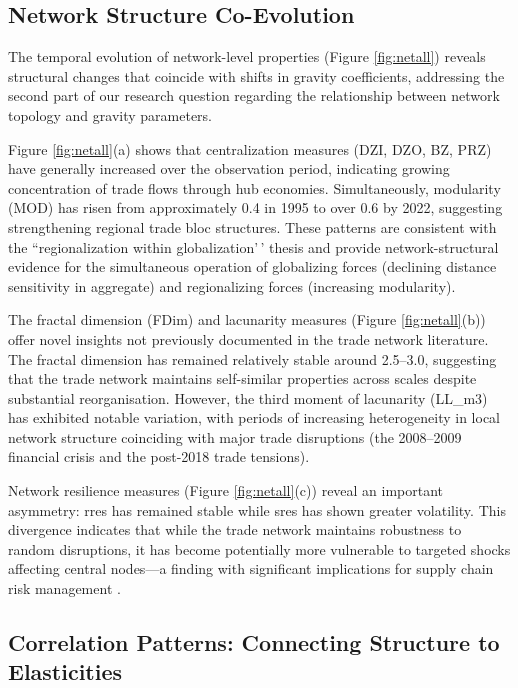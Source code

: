 \documentclass[preprint, 3p,
authoryear]{elsarticle} %
\begin{document}
\subsection{Network Structure
Co-Evolution}\label{subsec:network_coevolution}

The temporal evolution of network-level properties (Figure
\ref{fig:netall}) reveals structural changes that coincide with shifts
in gravity coefficients, addressing the second part of our research
question regarding the relationship between network topology and gravity
parameters.

Figure \ref{fig:netall}(a) shows that centralization measures (DZI, DZO,
BZ, PRZ) have generally increased over the observation period,
indicating growing concentration of trade flows through hub economies.
Simultaneously, modularity (MOD) has risen from approximately 0.4 in
1995 to over 0.6 by 2022, suggesting strengthening regional trade bloc
structures. These patterns are consistent with the ``regionalization
within globalization'\,' thesis \citep{baldwin2006} and provide
network-structural evidence for the simultaneous operation of
globalizing forces (declining distance sensitivity in aggregate) and
regionalizing forces (increasing modularity).

The fractal dimension (FDim) and lacunarity measures (Figure
\ref{fig:netall}(b)) offer novel insights not previously documented in
the trade network literature. The fractal dimension has remained
relatively stable around 2.5--3.0, suggesting that the trade network
maintains self-similar properties across scales despite substantial
reorganisation. However, the third moment of lacunarity (LL\_m3) has
exhibited notable variation, with periods of increasing heterogeneity in
local network structure coinciding with major trade disruptions (the
2008--2009 financial crisis and the post-2018 trade tensions).

Network resilience measures (Figure \ref{fig:netall}(c)) reveal an
important asymmetry: \gls{rres} has remained stable while \gls{sres} has
shown greater volatility. This divergence indicates that while the trade
network maintains robustness to random disruptions, it has become
potentially more vulnerable to targeted shocks affecting central
nodes---a finding with significant implications for supply chain risk
management \citep{carvalho2014, bonadio2021}.

\subsection{Correlation Patterns: Connecting Structure to
Elasticities}\label{subsec:correlations}
\end{document}
